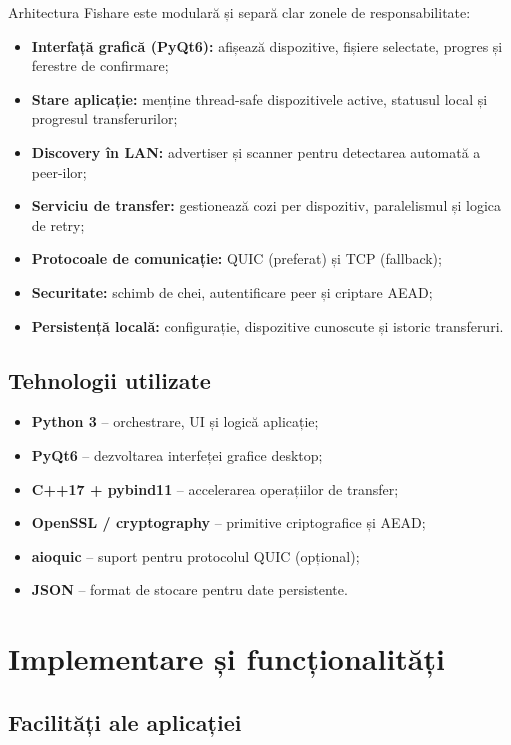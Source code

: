\documentclass[12pt,a4paper]{report}
\begin{document}
Arhitectura Fishare este modulară și separă clar zonele de responsabilitate:
\begin{itemize}
    \item \textbf{Interfață grafică (PyQt6):} afișează dispozitive, fișiere selectate, progres și ferestre de confirmare;
    \item \textbf{Stare aplicație:} menține thread-safe dispozitivele active, statusul local și progresul transferurilor;
    \item \textbf{Discovery în LAN:} advertiser și scanner pentru detectarea automată a peer-ilor;
    \item \textbf{Serviciu de transfer:} gestionează cozi per dispozitiv, paralelismul și logica de retry;
    \item \textbf{Protocoale de comunicație:} QUIC (preferat) și TCP (fallback);
    \item \textbf{Securitate:} schimb de chei, autentificare peer și criptare AEAD;
    \item \textbf{Persistență locală:} configurație, dispozitive cunoscute și istoric transferuri.
\end{itemize}

\section*{Tehnologii utilizate}

\begin{itemize}
    \item \textbf{Python 3} -- orchestrare, UI și logică aplicație;
    \item \textbf{PyQt6} -- dezvoltarea interfeței grafice desktop;
    \item \textbf{C++17 + pybind11} -- accelerarea operațiilor de transfer;
    \item \textbf{OpenSSL / cryptography} -- primitive criptografice și AEAD;
    \item \textbf{aioquic} -- suport pentru protocolul QUIC (opțional);
    \item \textbf{JSON} -- format de stocare pentru date persistente.
\end{itemize}

\newpage
\chapter{Implementare și funcționalități}

\section*{Facilități ale aplicației}
\end{document}
